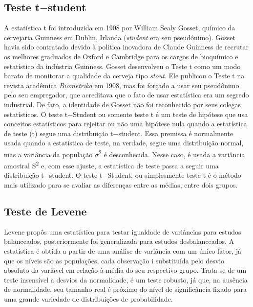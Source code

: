 \subsection{Teste t$-$student}

A estatística t foi introduzida em 1908 por William Sealy Gosset, químico da cervejaria Guinness em Dublin, Irlanda (\textit{student} era seu pseudônimo). Gosset havia sido contratado devido à política inovadora de Claude Guinness de recrutar os melhores graduados de Oxford e Cambridge para os cargos de bioquímico e estatístico da indústria Guinness. Gosset desenvolveu o Teste t como um modo barato de monitorar a qualidade da cerveja tipo \textit{stout}. Ele publicou o Teste t na revista acadêmica \textit{Biometrika} em 1908, mas foi forçado a usar seu pseudônimo pelo seu empregador, que acreditava que o fato de usar estatística era um segredo industrial. De fato, a identidade de Gosset não foi reconhecido por seus colegas estatísticos.\newline
\indent O teste t$-$Student ou somente teste t é um teste de hipótese que usa conceitos estatísticos para rejeitar ou não uma hipótese nula quando a estatística de teste (t) segue uma distribuição t$-$student.\newline
\indent Essa premissa é normalmente usada quando a estatística de teste, na verdade, segue uma distribuição normal, mas a variância da população $\sigma$\textsuperscript{2} é desconhecida. Nesse caso, é usada a variância amostral S\textsuperscript{2} e, com esse ajuste, a estatística de teste passa a seguir uma
distribuição t$-$student.\newline
\indent O teste t$-$Student, ou simplesmente teste t é o método mais utilizado para se avaliar as diferenças entre as médias, entre dois grupos. 

\subsection{Teste de Levene}

Levene propôs uma estatística para testar igualdade de variâncias para estudos balanceados, posteriormente foi generalizada para estudos desbalanceados. A estatística é obtida a partir de uma análise de variância com um único fator, já que os níveis são as populações, cada observação i substituída pelo desvio absoluto da variável em relação à média do seu respectivo grupo.\newline
\indent Trata-se de um teste insensível a desvios da normalidade, é um teste robusto, já que, na ausência de normalidade, seu tamanho real é próximo do nível de significância fixado para uma grande variedade de distribuições de probabilidade.

